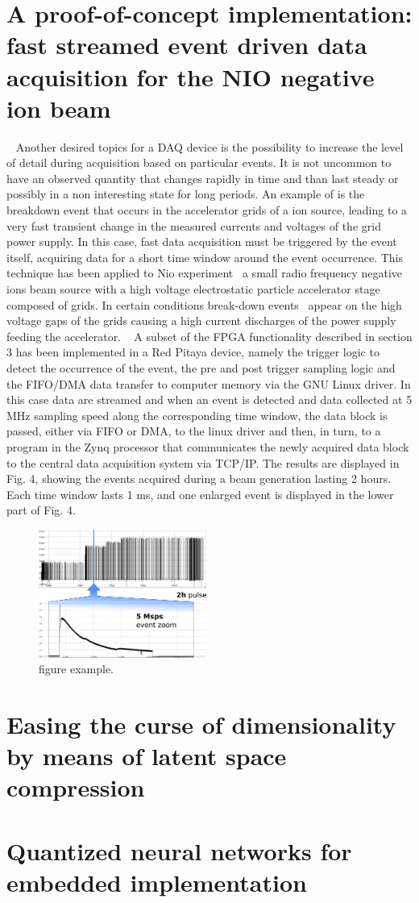 \section{A proof-of-concept implementation: fast streamed event driven data acquisition for the NIO negative ion beam}
~
Another desired topics for a DAQ device is the possibility to increase the level of detail during acquisition based on particular events. It is not uncommon to have an observed quantity that changes rapidly in time and than last steady or possibly in a non interesting state for long periods. An example of is the breakdown event that occurs in the accelerator grids of a ion source, leading to a very fast transient change in the measured currents and voltages of the grid power supply. In this case, fast data acquisition must be triggered by the event itself, acquiring data for a short time window around the event occurrence. This technique has been applied to Nio experiment~\cite{DEMURI2015249} a small radio frequency negative ions beam source with a high voltage electrostatic particle accelerator stage composed of grids. In certain conditions break-down events~\cite{RECCHIA20111545} appear on the high voltage gaps of the grids causing a  high current discharges of the power supply feeding the accelerator. 
~
A subset of the FPGA functionality described in section 3 has been implemented in a Red Pitaya device, namely the trigger logic to detect the occurrence of the event, the pre and post trigger sampling logic and the FIFO/DMA data transfer to computer memory via the GNU Linux driver. In this case data are streamed and when an event is detected and data collected at 5 MHz sampling speed along the corresponding time window, the data block is passed, either via FIFO or DMA, to the linux driver and then, in turn, to a program in the Zynq processor that communicates the newly acquired data block to the central data acquisition system via TCP/IP. The results are displayed in Fig. 4, showing the events acquired during a beam generation lasting 2 hours. Each time window lasts 1 ms, and one enlarged event is  displayed in the lower part of Fig. 4.    

\begin{figure}[ht]
\centering
\includegraphics[width=0.49\textwidth]{img/4_EmbeddedML/nio12b.png}
\caption{figure example.}
\label{fig:nio}
\end{figure}




\section{Easing the curse of dimensionality by means of latent space compression}

\section{Quantized neural networks for embedded implementation}
